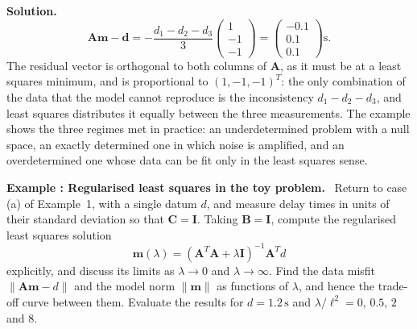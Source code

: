 \documentclass[a4paper,12pt]{paper}
\newcounter{example}
\renewenvironment{example}[1]{%
  \refstepcounter{example}%
  \begin{mdframed}[linewidth=1pt,innertopmargin=6pt,innerbottommargin=6pt]%
  \noindent\textbf{Example \theexample: #1.}\ }{%
  \end{mdframed}}
\newenvironment{solution}{\par\noindent\textbf{Solution.}\ }{\par\medskip}
\begin{document}
\begin{solution}
\begin{equation}
    \mathbf{A}\mathbf{m}-\mathbf{d} = -\frac{d_{1}-d_{2}-d_{3}}{3}\begin{pmatrix} 1 \\ -1 \\ -1 \end{pmatrix}
    = \begin{pmatrix} -0.1 \\ 0.1 \\ 0.1 \end{pmatrix}\mathrm{s}.
    \label{eq:10}
\end{equation}
The residual vector is orthogonal to both columns of $\mathbf{A}$, as it must be at a least squares
minimum, and is proportional to $(1,-1,-1)^{T}$: the only combination of the data that the model
cannot reproduce is the inconsistency $d_{1}-d_{2}-d_{3}$, and least squares distributes it equally
between the three measurements. The example shows the three regimes met in practice: an
underdetermined problem with a null space, an exactly determined one in which noise is amplified,
and an overdetermined one whose data can be fit only in the least squares sense.
\end{solution}

\begin{example}{Regularised least squares in the toy problem}
Return to case (a) of Example~1, with a single datum $d$, and measure delay times in units of their
standard deviation so that $\mathbf{C}=\mathbf{I}$. Taking $\mathbf{B}=\mathbf{I}$, compute the
regularised least squares solution
\begin{equation}
    \mathbf{m}(\lambda) = (\mathbf{A}^{T}\mathbf{A}+\lambda\mathbf{I})^{-1}\mathbf{A}^{T}d
    \label{eq:11}
\end{equation}
explicitly, and discuss its limits as $\lambda\to0$ and $\lambda\to\infty$. Find the data misfit
$\|\mathbf{A}\mathbf{m}-d\|$ and the model norm $\|\mathbf{m}\|$ as functions of $\lambda$, and
hence the trade-off curve between them. Evaluate the results for $d=1.2\,\mathrm{s}$ and
$\lambda/\ell^{2}=0$, $0.5$, $2$ and $8$.
\end{example}
\end{document}

